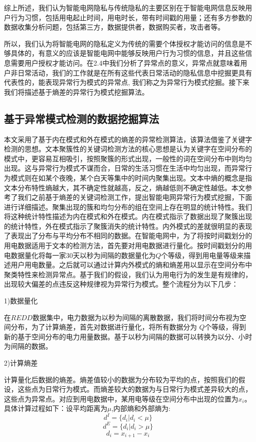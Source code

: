 \documentclass[10.5pt,twocolumn]{jbuaa}
\begin{document}
综上所述，我们认为智能电网隐私与传统隐私的主要区别在于智能电网信息反映用户行为习惯，包括用电起止时间，用电时长，带有时间戳的用量；还有多方参数的数据收集分析问题，包括第三方，数据提供者，数据购买者，攻击者等。

所以，我们认为将智能电网的隐私定义为传统的需要个体授权才能访问的信息是不够具体的，有意义的应该是智能电网中能够反映用户行为习惯的信息，并且这些信息需要用户授权才能访问。在2.4中我们分析了异常点的意义，异常点就意味着用户非日常活动，我们的工作就是在所有这些代表日常活动的隐私信息中挖掘更具有代表性的，能表现异常行为模式的异常点, 我们称之为异常行为模式挖掘。接下来我们将描述基于熵差的异常行为模式挖掘算法。

\subsection{基于异常模式检测的数据挖掘算法}
本文采用了基于内在模式和外在模式的熵差的异常检测算法，该算法借鉴了关键字检测的思想。文本聚簇性的关键词检测方法的核心思想是认为关键字在空间分布的模式中，更容易互相吸引，按照聚簇的形式出现，一般性的词在空间分布中则均匀出现。这与异常行为模式不谋而合，日常的生活习惯在生活中均匀出现，而异常行为模式则在如某个夜晚，某个白天等集中的时间内聚集出现。文本中熵的概念是指文本分布特性熵越大，其不确定性就越高，反之，熵越低则不确定性越低。本文参考了我们之前基于熵差的关键词检测工作，提出智能电网异常行为模式挖掘，下面进行详细描述。聚集出现的簇和均匀分布的组在空间上存在明显的统计特性。我们将这种统计特性描述为内在模式和外在模式。内在模式指示了数据出现了聚簇出现的统计特性，外在模式指示了聚簇消失的统计特性。内外模式的差就很明显的表现了表现出了分布与平均分布不相同的数据。在智能电网中，为了将按时间戳划分的用电数据适用于文本的检测方法，首先要对用电数据进行量化。按时间戳划分的用电数据量化将每一家30天以秒为间隔的数据量化为$Q$个等级，得到用电量等级来描述用户用电数量。之后就可以通过计算内外模式的熵和熵差用以显示在空间分布中聚类特性来检测异常点。基于我们的假设，我们认为用电行为的发生是有规律的，出现较大偏差的点违反这种规律视为异常行为模式。整个流程分为以下几步：

1)数据量化

在$REDD$数据集中，电力数据为以秒为间隔的离散数据，我们将时间分布视为空间分布，为了计算熵差，首先对数据进行量化，将所有数据分为
$Q$个等级，得到新的基于空间分布的电力用量数据。基于以秒为间隔的数据可以转换为以分、小时为间隔的数据。

2)计算熵差

计算量化后数据的熵差。熵差值较小的数据为分布较为平均的点，按照我们的假设，这些点为日常行为模式。而熵差较大的数据为与日常行为模式差异较大的点，这些点为异常点。对应到用电数据中，某用电等级在空间分布中出现的位置为$x_i$。具体计算过程如下：设平均距离为$\mu$,内部熵和外部熵为:
\begin{equation}
\label{eqnLabelp4-1}
d^I = \lbrace d_i|d_i<\mu \rbrace
\end{equation}
\begin{equation}
\label{eqnLabelp4-2}
d^E = \lbrace d_i|d_i>\mu \rbrace
\end{equation}
\begin{equation}
\label{eqnLabelp4-3}
d_i = x_{i+1} - x_i
\end{equation}
\end{document}
